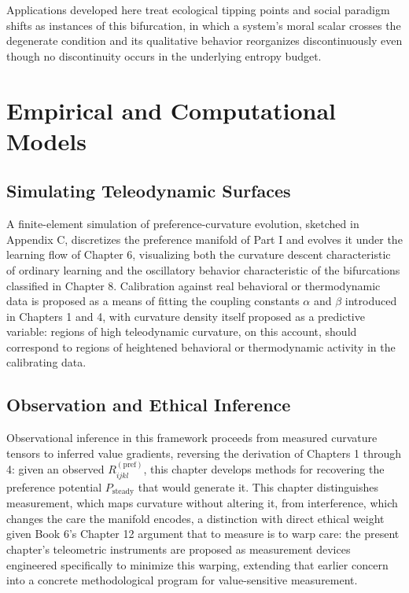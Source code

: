 Applications developed here treat ecological tipping points and social paradigm shifts as instances of this bifurcation, in which a system's moral scalar crosses the degenerate condition and its qualitative behavior reorganizes discontinuously even though no discontinuity occurs in the underlying entropy budget.

\part{Empirical and Computational Models}

\chapter{Simulating Teleodynamic Surfaces}

A finite-element simulation of preference-curvature evolution, sketched in Appendix C, discretizes the preference manifold of Part I and evolves it under the learning flow of Chapter 6, visualizing both the curvature descent characteristic of ordinary learning and the oscillatory behavior characteristic of the bifurcations classified in Chapter 8. Calibration against real behavioral or thermodynamic data is proposed as a means of fitting the coupling constants $\alpha$ and $\beta$ introduced in Chapters 1 and 4, with curvature density itself proposed as a predictive variable: regions of high teleodynamic curvature, on this account, should correspond to regions of heightened behavioral or thermodynamic activity in the calibrating data.

\chapter{Observation and Ethical Inference}

Observational inference in this framework proceeds from measured curvature tensors to inferred value gradients, reversing the derivation of Chapters 1 through 4: given an observed $R^{(\text{pref})}_{ijkl}$, this chapter develops methods for recovering the preference potential $P_{\text{steady}}$ that would generate it. This chapter distinguishes measurement, which maps curvature without altering it, from interference, which changes the care the manifold encodes, a distinction with direct ethical weight given Book 6's Chapter 12 argument that to measure is to warp care: the present chapter's teleometric instruments are proposed as measurement devices engineered specifically to minimize this warping, extending that earlier concern into a concrete methodological program for value-sensitive measurement.

